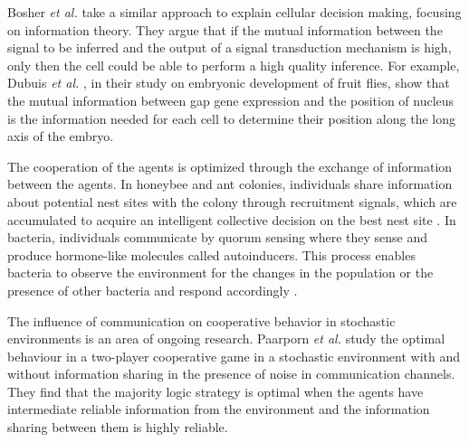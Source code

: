 Bosher \textit{et al.} \cite{Bowsher2014} take a similar approach to explain cellular decision making, focusing on information theory. They argue that if the mutual information between the signal to be inferred and the output of a signal transduction mechanism is high, only then the cell could be able to perform a high quality inference. For example, Dubuis \textit{et al.} \cite{dubuis2013}, in their study on embryonic development of fruit flies, show that the mutual information between gap gene expression and the position of nucleus is the information needed for each cell to determine their position along the long axis of the embryo. \par
The cooperation of the agents is optimized through the exchange of information between the agents. In honeybee and ant colonies, individuals share information about potential nest sites with the colony through recruitment signals, which are accumulated to acquire an intelligent collective decision on the best nest site \cite{Franks2002}. In bacteria, individuals communicate by quorum sensing where they sense and produce hormone-like molecules called autoinducers. This process enables bacteria to observe the environment for the changes in the population or the presence of other bacteria and respond accordingly \cite{waters2005quorum}.\par
The influence of communication on cooperative behavior in stochastic environments is an area of ongoing research. Paarporn \textit{et al.} \cite{Paarporn2018a} study the optimal behaviour in a two-player cooperative game in a stochastic environment with and without information sharing in the presence of noise in communication channels. They find that the majority logic strategy is optimal when the agents have intermediate reliable information from the environment and the information sharing between them is highly reliable.

